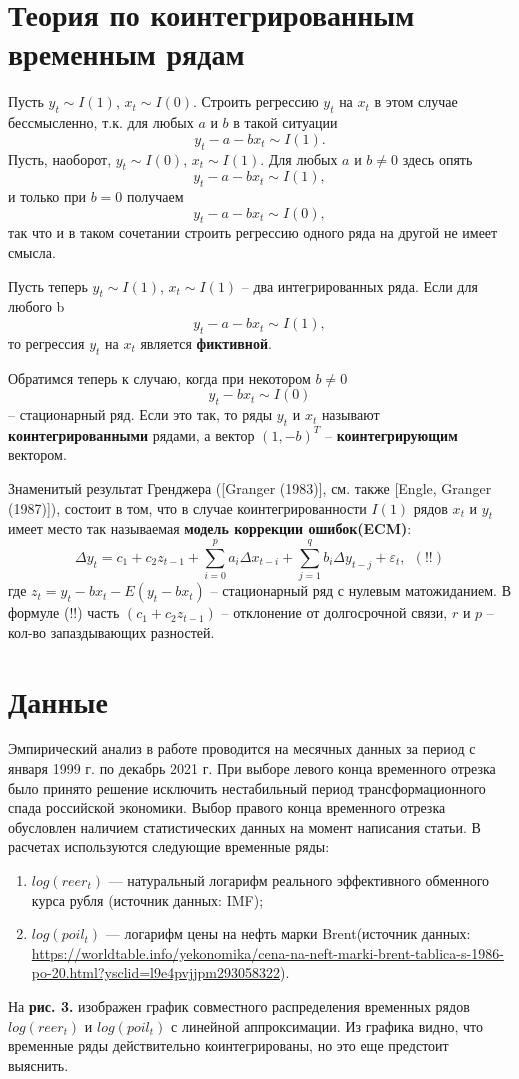 \documentclass{article}
\begin{document}
\section{Теория по коинтегрированным временным рядам}
Пусть $y_t\sim I(1)$,  $x_t\sim I(0)$. Строить регрессию $y_t$ на $x_t$ в этом случае бессмысленно, т.к. для любых $a$ и $b$ в такой ситуации
$$y_t-a-bx_t\sim I(1).$$
Пусть, наоборот, $y_t \sim I(0)$, $x_t \sim I(1)$. Для любых $a$ и $b \neq 0$ здесь опять 
$$y_t-a-bx_t\sim I(1),$$
и только при $b = 0$ получаем
$$y_t-a-bx_t \sim I(0),$$
так что и в таком сочетании строить регрессию одного ряда на другой не имеет смысла.

Пусть теперь $y_t \sim I(1)$, $x_t \sim I(1)$ – два интегрированных ряда.
Если для любого b
$$y_t-a-bx_t\sim I(1),$$
то регрессия $y_t$ на $x_t$ является \textbf{фиктивной}.

Обратимся теперь к случаю, когда при некотором $b \neq 0$
$$y_t - b x_t \sim I(0)$$ 
-- стационарный ряд. Если это так, то ряды $y_t$ и $x_t$ называют \textbf{коинтегрированными} рядами, а вектор $(1, -b)^T$ -- \textbf{коинтегрирующим} вектором.

Знаменитый результат Гренджера ([Granger (1983)], см. также [Engle, Granger (1987)]), состоит в том, что в случае коинтегрированности $I(1)$ рядов $x_t$ и $y_t$ имеет место так называемая \textbf{модель коррекции ошибок(ECM)}:
$$\Delta y_t=c_1+c_2z_{t-1}+\sum_{i=0}^p{a_i \Delta x_{t-i}}+\sum_{j=1}^q{b_i \Delta y_{t-j}}+\varepsilon_t,~~(!!)$$
где $z_t=y_t-bx_t-E(y_t-bx_t)$ -- стационарный ряд с нулевым матожиданием. В формуле (!!) часть $(c_1+c_2z_{t-1})$ -- отклонение от долгосрочной связи, $r$ и $p$ -- кол-во запаздывающих разностей.

\section{Данные}
Эмпирический анализ в работе проводится на месячных данных за период с января 1999 г. по декабрь 2021 г. При выборе левого конца временного отрезка было принято решение исключить нестабильный период трансформационного спада российской экономики. Выбор правого конца временного отрезка обусловлен наличием статистических данных на момент написания статьи. В расчетах используются следующие временные ряды:
\begin{enumerate}
\item $log(reer_t)$ — натуральный логарифм реального эффективного обменного курса рубля (источник данных: IMF);
\item $log(poil_t)$ — логарифм цены на нефть марки Brent(источник данных: \url{https://worldtable.info/yekonomika/cena-na-neft-marki-brent-tablica-s-1986-po-20.html?ysclid=l9e4pvjjpm293058322}).
\end{enumerate}
На \textbf{рис. 3.} изображен график совместного распределения временных рядов $log(reer_t)$ и  $log(poil_t)$ с линейной аппроксимации. Из графика видно, что временные ряды действительно коинтегрированы, но это еще предстоит выяснить. 
\end{document}
